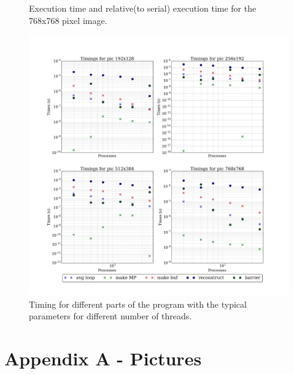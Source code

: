 \documentclass[11pt]{article}
\begin{document}
\begin{figure}[ht]
\begin{minipage}[b]{.5\textwidth}
			\caption{Execution time and relative(to serial) execution time for the 768x768 pixel image.}\label{exec_4}
		\end{minipage}
	\end{figure}

	
	\begin{figure}[H]	
		\centering
		\includegraphics[scale=.3, width=\textwidth ]{timings.jpeg}
		\caption{Timing for different parts of the program with the typical parameters for different number of threads.}\label{tim1}
	\end{figure}
	
	


	\pagebreak
	\section{Appendix A - Pictures} \label{ap1}
	
\end{document}
